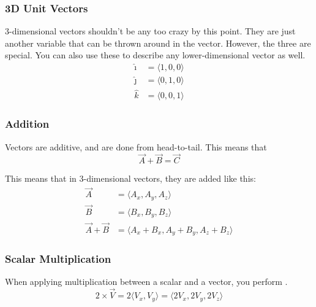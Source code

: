 \subsubsection{3D Unit Vectors} \label{subsubsec:3D Unit Vectors}
3-dimensional vectors shouldn't be any too crazy by this point.
They are just another variable that can be thrown around in the vector.
However, the three  are special.
You can also use these to describe any lower-dimensional vector as well.
\begin{equation}
  \begin{aligned}
    \hat{\imath} &= \langle 1, 0, 0 \rangle \\
    \hat{\jmath} &= \langle 0, 1, 0 \rangle \\
    \hat{k} &= \langle 0, 0, 1 \rangle
  \end{aligned}
\end{equation}

\subsubsection{Addition} \label{subsubsec:Vector Addition}
Vectors are additive, and are done from head-to-tail.
This means that
\begin{equation} \label{eq:Vector Addition}
  \vec{A} + \vec{B} = \vec{C}  
\end{equation}

This means that in 3-dimensional vectors, they are added like this:
\begin{equation} \label{eq:3D Vector Addition}
  \begin{aligned}
    \vec{A} &= \langle A_{x}, A_{y}, A_{z} \rangle \\
    \vec{B} &= \langle B_{x}, B_{y}, B_{z} \rangle \\
    \vec{A} + \vec{B} &= \langle A_{x}+B_{x}, A_{y}+B_{y}, A_{z}+B_{z} \rangle
  \end{aligned}
\end{equation}

\subsubsection{Scalar Multiplication} \label{subsubsec:Scalar Vector Multiplication}
When applying multiplication between a scalar and a vector, you perform .
\begin{equation} \label{eq:Scalar Vector Multiplication}
  2 \times \vec{V} = 2 \langle V_{x}, V_{y} \rangle = \langle 2V_{x}, 2V_{y}, 2V_{z} \rangle
\end{equation}

